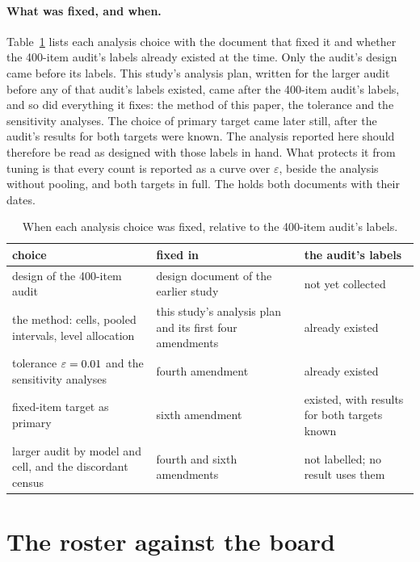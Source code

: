 \paragraph{What was fixed, and when.}
Table~\ref{tab:chronology} lists each analysis choice with the document that fixed
it and whether the 400-item audit's labels already existed at the time. Only the audit's design
came before its labels. This study's analysis plan, written for the larger audit before any of that
audit's labels existed, came after the 400-item audit's labels, and so did everything it fixes:
the method of this paper, the tolerance and the sensitivity analyses. The choice of primary target
came later still, after the audit's results for both targets were known. The analysis reported here should therefore be read as
designed with those labels in hand. What protects it from tuning is that every count is reported
as a curve over $\varepsilon$, beside the analysis without pooling, and both targets in full. The
\SuppShort{} holds both documents with their dates.

\begin{table}[h]
\centering
\caption{When each analysis choice was fixed, relative to the 400-item audit's labels.}
\label{tab:chronology}
\small
\begin{tabular}{>{\raggedright\arraybackslash}p{\chronwide}>{\raggedright\arraybackslash}p{\chronmid}>{\raggedright\arraybackslash}p{\chronlast}}
\toprule
choice & fixed in & the audit's labels \\
\midrule
design of the 400-item audit & design document of the earlier study & not yet collected \\
the method: cells, pooled intervals, level allocation & this study's analysis plan and its first four amendments & already existed \\
tolerance $\varepsilon = 0.01$ and the sensitivity analyses & fourth amendment & already existed \\
fixed-item target as primary & sixth amendment & existed, with results for both targets known \\
larger audit by model and cell, and the discordant census & fourth and sixth amendments & not labelled; no result uses them \\
\bottomrule
\end{tabular}
\end{table}

\section{The roster against the board}
\label{app:board}

